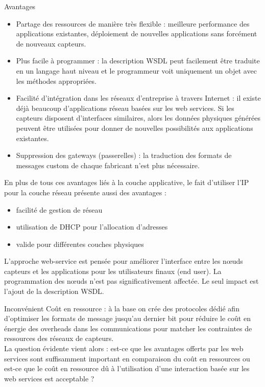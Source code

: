 \begin{frame}{Avantages}
\begin{itemize}
\item Partage des ressources de manière très flexible : meilleure performance des applications existantes, déploiement de nouvelles applications sans forcément de nouveaux capteurs.
\item Plus facile à programmer : la description WSDL peut facilement être traduite en un langage haut niveau et le programmeur voit uniquement un objet avec les méthodes appropriées.
\item Facilité d’intégration dans les réseaux d’entreprise à travers Internet : il existe déjà beaucoup d’applications réseau basées sur les web services. Si les capteurs disposent d’interfaces similaires, alors les données physiques générées peuvent être utilisées pour donner de nouvelles possibilités aux applications existantes.
\item Suppression des gateways (passerelles) : la traduction des formats de messages  custom  de chaque fabricant n’est plus nécessaire.
\end{itemize}
\end{frame}
\begin{frame}
En plus de tous ces avantages liés à la couche applicative, le fait d’utiliser l’IP pour la couche réseau présente aussi des avantages : \begin{itemize}
\item facilité de gestion de réseau
\item utilisation de DHCP pour l’allocation d’adresses
\item valide pour différentes couches physiques
\end{itemize}

L’approche web-service est pensée pour améliorer l’interface entre les nœuds capteurs et les applications pour les utilisateurs finaux (end user). La programmation des nœuds n’est pas significativement affectée. Le seul impact est l’ajout de la description WSDL.

\end{frame}
\begin{frame}{Inconvénient}
Coût en ressource : à la base on crée des protocoles dédié afin d’optimiser les formats de message jusqu’au dernier bit pour réduire le coût en énergie des overheads dans les communications pour matcher les contraintes de ressources des réseaux de capteurs.
\\La question évidente vient alors : est-ce que les avantages offerts par les web services sont suffisamment important en comparaison du coût en ressources ou est-ce que le coût en ressource dû à l’utilisation d’une interaction basée sur les web services est acceptable ?

\end{frame}
